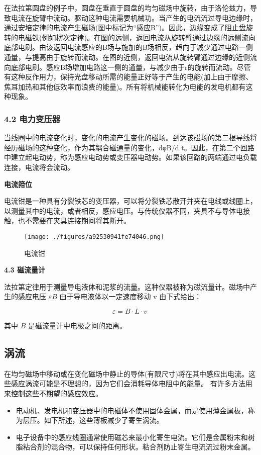 在法拉第圆盘的例子中，圆盘在垂直于圆盘的均匀磁场中旋转，由于洛伦兹力，导致电流在旋臂中流动。驱动这种电流需要机械功。当产生的电流流过导电边缘时，通过安培定律的电流产生磁场(图中标记为“感应B”)。因此，边缘变成了阻止盘旋转的电磁铁(例如楞次定律)。在图的远侧，返回电流从旋转臂通过边缘的远侧流向底部电刷。由该返回电流感应的B场与施加的B场相反，趋向于减少通过电路一侧通量，与提高由于旋转而流动。在图的近侧，返回电流从旋转臂通过边缘的近侧流向底部电刷。感应B场增加电路这一侧的通量，与减少由于r的旋转而流动。尽管有这种反作用力，保持光盘移动所需的能量正好等于产生的电能(加上由于摩擦、焦耳加热和其他低效率而浪费的能量)。所有将机械能转化为电能的发电机都有这种现象。
\subsubsection{4.2 电力变压器}
当线圈中的电流变化时，变化的电流产生变化的磁场。到达该磁场的第二根导线将经历磁场的这种变化，作为其耦合磁通量的变化，dφB/d t。因此，在第二个回路中建立起电动势，称为感应电动势或变压器电动势。如果该回路的两端通过电负载连接，电流将会流动。

\textbf{电流箝位}

电流钳是一种具有分裂铁芯的变压器，可以将分裂铁芯散开并夹在电线或线圈上，以测量其中的电流，或者相反，感应电压。与传统仪器不同，夹具不与导体电接触，也不需要在夹具连接期间将其断开。
\begin{figure}[ht]
\centering
\texttt{[image: ./figures/a92530941fe74046.png]}
\caption{电流钳} \label{fig_DCGY_8}
\end{figure}

\textbf{4.3 磁流量计}

法拉第定律用于测量导电液体和泥浆的流量。这种仪器被称为磁流量计。磁场中产生的感应电压 $\varepsilon B$ 由于导电液体以一定速度移动 v 由下式给出：

$$\varepsilon = B \cdot L \cdot v~$$

其中 $B$ 是磁流量计中电极之间的距离。

\subsection{涡流}
在均匀磁场中移动或在变化磁场中静止的导体(有限尺寸)将在其中感应出电流。这些感应涡流可能是不理想的，因为它们会消耗导体电阻中的能量。 有许多方法用来控制这些不期望的感应效应。
\begin{itemize}
\item 电动机、发电机和变压器中的电磁体不使用固体金属，而是使用薄金属板，称为层压。如下所述，这些薄板减少了寄生涡流。
\item 电子设备中的感应线圈通常使用磁芯来最小化寄生电流。它们是金属粉末和树脂粘合剂的混合物，可以保持任何形状。粘合剂防止寄生电流流过粉末金属。
\end{itemize}
